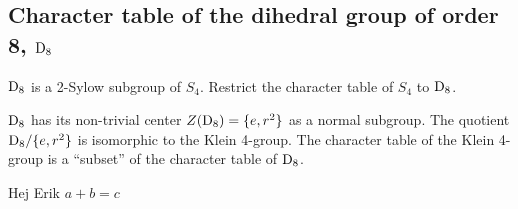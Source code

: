 \subsection{Character table of the dihedral group of order 8, $\text{D}_8$}

$\text{D}_8$ is a 2-Sylow subgroup of $S_4$. Restrict the character table of $S_4$ to $\text{D}_8$. 

$\text{D}_8$ has its non-trivial                                                                                                                                                                                                                                                              center $Z(\text{D}_8) = \{e, r^2\}$ as a normal subgroup. The quotient $\text{D}_8/\{e, r^2\}$ is isomorphic to the Klein 4-group. The character table of the Klein 4-group is a ``subset'' of the character table of $\text{D}_8$.


Hej Erik $a+b=c$